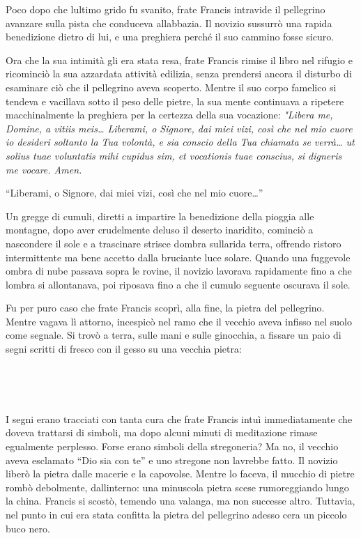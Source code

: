 Poco dopo che l\textquotesingle ultimo grido fu svanito, frate Francis
intravide il pellegrino avanzare sulla pista che conduceva
all\textquotesingle abbazia. Il novizio sussurrò una rapida benedizione
dietro di lui, e una preghiera perché il suo cammino fosse sicuro.

Ora che la sua intimità gli era stata resa, frate Francis rimise il
libro nel rifugio e ricominciò la sua azzardata attività edilizia, senza
prendersi ancora il disturbo di esaminare ciò che il pellegrino aveva
scoperto. Mentre il suo corpo famelico si tendeva e vacillava sotto il
peso delle pietre, la sua mente continuava a ripetere macchinalmente la
preghiera per la certezza della sua vocazione: \emph{"Libera me, Domine,
	a vitiis meis\ldots{} Liberami, o Signore, dai miei vizi, così che nel
	mio cuore io desideri soltanto la Tua volontà, e sia conscio della Tua
	chiamata se verrà\ldots{} ut solius tuae voluntatis mihi cupidus sim, et
	vocationis tuae conscius, si digneris me vocare. Amen.}

``Liberami, o Signore, dai miei vizi, così che nel mio cuore\ldots''

Un gregge di cumuli, diretti a impartire la benedizione della pioggia
alle montagne, dopo aver crudelmente deluso il deserto inaridito,
cominciò a nascondere il sole e a trascinare strisce
d\textquotesingle ombra sull\textquotesingle arida terra, offrendo
ristoro intermittente ma bene accetto dalla bruciante luce solare.
Quando una fuggevole ombra di nube passava sopra le rovine, il novizio
lavorava rapidamente fino a che l\textquotesingle ombra si allontanava,
poi riposava fino a che il cumulo seguente oscurava il sole.

Fu per puro caso che frate Francis scoprì, alla fine, la pietra del
pellegrino. Mentre vagava lì attorno, incespicò nel ramo che il vecchio
aveva infisso nel suolo come segnale. Si trovò a terra, sulle mani e
sulle ginocchia, a fissare un paio di segni scritti di fresco con il
gesso su una vecchia pietra:

\begin{center}
	{\Huge{}}
\end{center}\

~

I segni erano tracciati con tanta cura che frate Francis intuì
immediatamente che doveva trattarsi di simboli, ma dopo alcuni minuti di
meditazione rimase egualmente perplesso. Forse erano simboli della
stregoneria? Ma no, il vecchio aveva esclamato ``Dio sia con te'' e uno
stregone non l\textquotesingle avrebbe fatto. Il novizio liberò la
pietra dalle macerie e la capovolse. Mentre lo faceva, il mucchio di
pietre rombò debolmente, dall\textquotesingle interno: una minuscola
pietra scese rumoreggiando lungo la china. Francis si scostò, temendo
una valanga, ma non successe altro. Tuttavia, nel punto in cui era stata
confitta la pietra del pellegrino adesso c\textquotesingle era un
piccolo buco nero.

